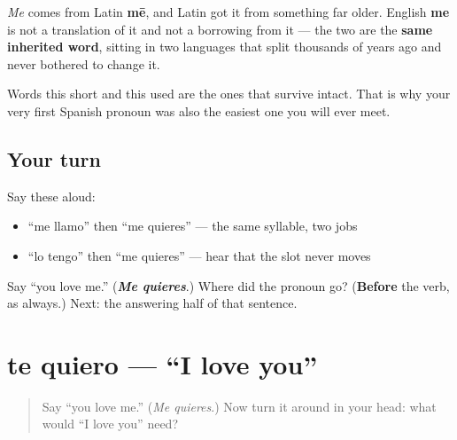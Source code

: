 \begin{cousinweb}
\emph{Me} comes from Latin \textbf{mē}, and Latin got it from something far older. English \textbf{me} is not a translation of it and not a borrowing from it — the two are the \textbf{same inherited word}, sitting in two languages that split thousands of years ago and never bothered to change it.

Words this short and this used are the ones that survive intact. That is why your very first Spanish pronoun was also the easiest one you will ever meet.
\end{cousinweb}

\subsection*{Your turn}
Say these aloud:

\begin{itemize}
\raggedright
  \item \textquotedblleft{}me llamo\textquotedblright{} then \textquotedblleft{}me quieres\textquotedblright{} — the same syllable, two jobs
  \item \textquotedblleft{}lo tengo\textquotedblright{} then \textquotedblleft{}me quieres\textquotedblright{} — hear that the slot never moves
\end{itemize}

\begin{tcolorbox}[breakable,colback=teal!4,colframe=teal!35!black,title={Before you move on}]
Say \textquotedblleft{}you love me.\textquotedblright{} (\emph{\textbf{Me quieres}}.) Where did the pronoun go? (\textbf{Before} the verb, as always.) Next: the answering half of that sentence.
\end{tcolorbox}
\section[te quiero]{te quiero — \textquotedblleft{}I love you\textquotedblright{}}

\label{lesson:ES-C42-te}



\begin{quote}
Say \textquotedblleft{}you love me.\textquotedblright{} (\emph{Me quieres}.) Now turn it around in your head: what would \textquotedblleft{}I love you\textquotedblright{} need?
\end{quote}

